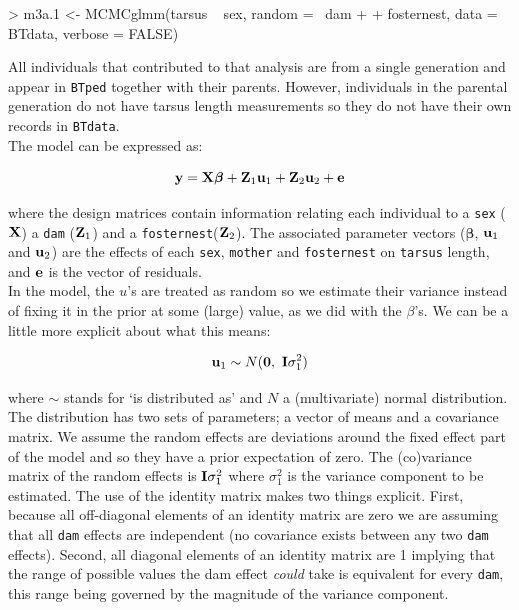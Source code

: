 \documentclass{article}
\begin{document}
\begin{Schunk}
\begin{Sinput}
> m3a.1 <- MCMCglmm(tarsus ~ sex, random = ~dam + 
+     fosternest, data = BTdata, verbose = FALSE)
\end{Sinput}
\end{Schunk}

All individuals that contributed to that analysis are from a single generation and appear in \texttt{BTped} together with their parents. However, individuals in the parental generation do not have tarsus length measurements so they do not have their own records in \texttt{BTdata}.\\

The model can be expressed as:

\begin{equation}
{\bf y}  = {\bf X}{\bm \beta}+{\bf Z}_{1}{\bf u}_{1}+{\bf Z}_{2}{\bf u}_{2}+{\bf e}
\end{equation}

where the design matrices contain information relating each individual to a  \texttt{sex} (${\bf X}$) a  \texttt{dam} (${\bf Z}_{1}$) and a \texttt{fosternest}(${\bf Z}_{2}$). The associated parameter vectors (${\bm \beta}$, ${\bf u}_{1}$ and ${\bf u}_{2}$) are the effects of each \texttt{sex}, \texttt{mother} and \texttt{fosternest} on \texttt{tarsus} length, and ${\bf e}$ is the vector of residuals.\\

In the model, the $u$'s are treated as random so we estimate their variance instead of fixing it in the prior at some (large) value, as we did with the $\beta$'s.  We can be a little more explicit about what this means:

\begin{equation}
{\bf u}_{1}  \sim N({\bf 0},\ {\bf I}\sigma^{2}_{1})
\end{equation}

where $\sim$ stands for `is distributed as' and $N$ a (multivariate) normal distribution. The distribution has two sets of parameters; a vector of means and a covariance matrix. We assume the random effects are deviations around the fixed effect part of the model and so they have a prior expectation  of zero. The (co)variance matrix of the random effects is ${\bf I}\sigma^{2}_{1}$ where $\sigma^{2}_{1}$ is the variance component to be estimated.  The use of the identity matrix makes two things explicit. First, because all off-diagonal elements of an identity matrix are zero we are assuming that all \texttt{dam} effects are independent (no covariance exists between any two \texttt{dam} effects). Second, all diagonal elements of an identity matrix are 1 implying that the range of possible values the dam effect \emph{could} take is equivalent for every \texttt{dam}, this range being governed by the magnitude of the variance component.\\
\end{document}
